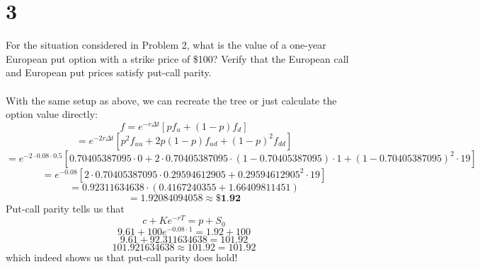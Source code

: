 \documentclass{article}
\begin{document}
{\Large 

\section*{3}
For the situation considered in Problem 2, what is the value of a one-year European put option with a strike price of \$100? Verify that the European call and European put prices satisfy put-call parity. \\ \\
With the same setup as above, we can recreate the tree or just calculate the option value directly:
\[
  f = e^{-r\Delta t} [pf_{u} + (1 - p)f_{d}]
\]
\[
  = e^{-2r\Delta t} [p^2f_{uu} + 2p(1 - p)f_{ud} + (1-p)^2f_{dd}]
\]
\(= e^{-2 \cdot 0.08 \cdot 0.5} [0.70405387095 \cdot 0 + 2 \cdot 0.70405387095 \cdot (1 - 0.70405387095) \cdot 1 + (1 - 0.70405387095)^2 \cdot 19]
\)
\[
  = e^{-0.08} [2 \cdot 0.70405387095 \cdot 0.29594612905 + 0.29594612905^2 \cdot 19]
\]
\[
  = 0.92311634638 \cdot (0.4167240355 + 1.66409811451)
\]
\[
  = 1.92084094058 \approx \boxed{\textbf{\$1.92}}
\]
Put-call parity tells us that 
\[
  c + Ke^{-rT} = p + S_0
\]
\[
  9.61 + 100e^{-0.08 \cdot 1} = 1.92 + 100
\]
\[
  9.61 + 92.311634638 = 101.92
\]
\[
  101.921634638 \approx 101.92 = 101.92
\]
which indeed shows us that put-call parity does hold!

}
\end{document}
